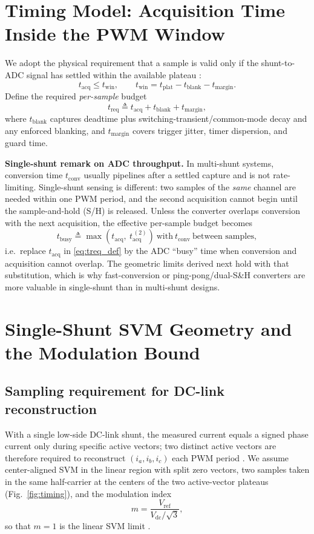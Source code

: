 \documentclass[conference]{IEEEtran}
\newcommand{\tacq}{t_{\mathrm{acq}}}
\newcommand{\tconv}{t_{\mathrm{conv}}}
\newcommand{\tbusy}{t_{\mathrm{busy}}}
\newcommand{\tblank}{t_{\mathrm{blank}}}
\newcommand{\tmargin}{t_{\mathrm{margin}}}
\newcommand{\treq}{t_{\mathrm{req}}}
\newcommand{\midx}{m}
\begin{document}
\section{Timing Model: Acquisition Time Inside the PWM Window}
We adopt the physical requirement that a sample is valid only if the shunt-to-ADC signal has settled within the available plateau \cite{wendler_enhancing_2025}:
\begin{equation}
  \tacq \le t_{\mathrm{win}}, \qquad
  t_{\mathrm{win}} = t_{\mathrm{plat}} - \tblank - \tmargin .
\label{eq:window}
\end{equation}
Define the required \emph{per-sample} budget
\begin{equation}
\treq \triangleq \tacq + \tblank + \tmargin ,
\label{eq:treq_def}
\end{equation}
where $\tblank$ captures deadtime plus switching-transient/common-mode decay and any enforced blanking, and $\tmargin$ covers trigger jitter, timer dispersion, and guard time.

\noindent\textbf{Single-shunt remark on ADC throughput.}
In multi-shunt systems, conversion time $\tconv$ usually pipelines after a settled capture and is not rate-limiting. Single-shunt sensing is different: two samples of the \emph{same} channel are needed within one PWM period, and the second acquisition cannot begin until the sample-and-hold (S/H) is released. Unless the converter overlaps conversion with the next acquisition, the effective per-sample budget becomes
\begin{equation}
\tbusy \triangleq \max(\tacq,\ \tacq^{\,(2)}) \ \text{with}\ \tconv\ \text{between samples},
\end{equation}
i.e.\ replace $\tacq$ in \eqref{eq:treq_def} by the ADC ``busy'' time when conversion and acquisition cannot overlap. The geometric limits derived next hold with that substitution, which is why fast-conversion or ping-pong/dual-S\&H converters are more valuable in single-shunt than in multi-shunt designs.

\section{Single-Shunt SVM Geometry and the Modulation Bound}
\subsection{Sampling requirement for DC-link reconstruction}
With a single low-side DC-link shunt, the measured current equals a signed phase current only during specific active vectors; two distinct active vectors are therefore required to reconstruct $(i_a,i_b,i_c)$ each PWM period \cite{Blaabjerg1997}. We assume center-aligned SVM in the linear region with split zero vectors, two samples taken in the same half-carrier at the centers of the two active-vector plateaus (Fig.~\ref{fig:timing}), and the modulation index
\begin{equation}
  \midx = \frac{V_{\mathrm{ref}}}{V_{\mathrm{dc}}/\sqrt{3}},
\label{eq:m_def}
\end{equation}
so that $\midx=1$ is the linear SVM limit \cite{VanDerBroeck1986}.
\end{document}
